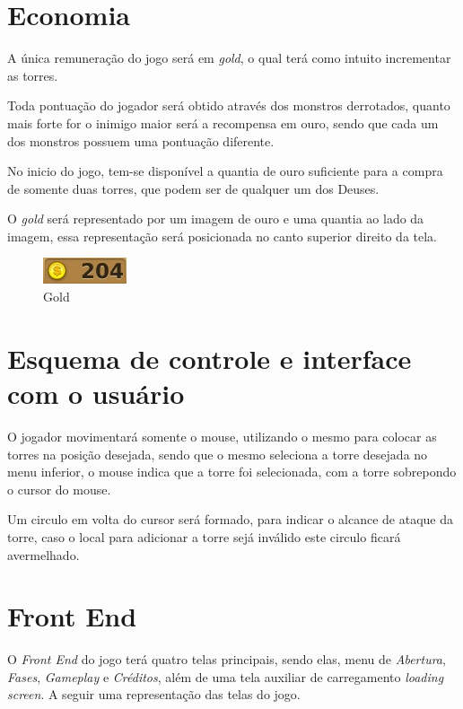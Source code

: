 \documentclass[11pt]{article} %
\begin{document}
\newpage

\section{Economia}

A única remuneração do jogo será em \textit{gold}, o qual terá como intuito incrementar as torres.  

Toda pontuação do jogador será obtido através dos monstros derrotados, quanto mais forte for o inimigo  maior será a recompensa em ouro, sendo que cada um dos monstros possuem uma pontuação diferente.

No inicio do jogo, tem-se disponível a quantia de ouro suficiente para a compra de somente duas torres, que podem ser de qualquer um dos Deuses.  

O \textit{gold} será representado por um imagem de ouro e uma quantia ao lado da imagem, essa representação será posicionada no canto superior direito da tela.

\begin{figure}[!htp]
\centering
\includegraphics[scale=1.25]{res/gold.png}
\caption{Gold}
\label{Tela Equip}
\end{figure}

\section{Esquema de controle e interface com o usuário}

O jogador movimentará somente o mouse, utilizando o mesmo para colocar as torres na posição desejada, sendo que o mesmo seleciona a torre desejada no menu inferior, o mouse indica que a torre foi selecionada, com a torre sobrepondo o cursor do mouse.

Um circulo em volta do cursor será formado, para indicar o alcance de ataque da torre, caso o local para adicionar a torre sejá inválido este circulo ficará avermelhado.  

\newpage

\section{Front End}

O \textit{Front End} do jogo terá  quatro telas principais, sendo elas, menu de \textit{Abertura}, \textit{Fases}, \textit{Gameplay} e \textit{Créditos}, além de uma tela auxiliar de carregamento \textit{loading screen}. A seguir uma representação das telas do jogo.
\end{document}
